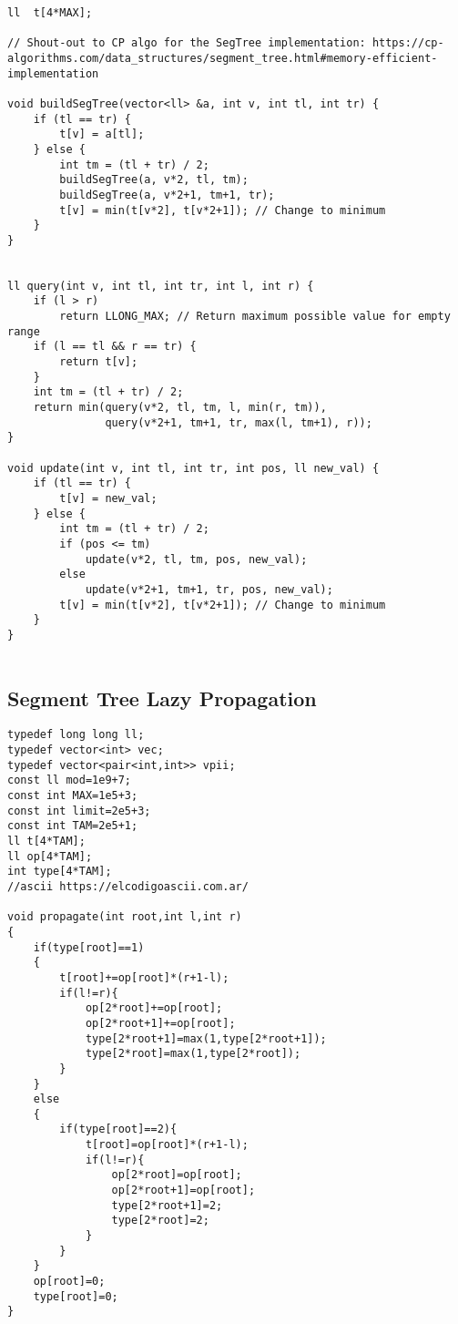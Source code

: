 \documentclass[10pt]{article}
\begin{document}
\begin{multicols*}{2}
\begin{lstlisting}[style=compactcpp]
ll  t[4*MAX];
 
// Shout-out to CP algo for the SegTree implementation: https://cp-algorithms.com/data_structures/segment_tree.html#memory-efficient-implementation
 
void buildSegTree(vector<ll> &a, int v, int tl, int tr) {
    if (tl == tr) {
        t[v] = a[tl];
    } else {
        int tm = (tl + tr) / 2;
        buildSegTree(a, v*2, tl, tm);
        buildSegTree(a, v*2+1, tm+1, tr);
        t[v] = min(t[v*2], t[v*2+1]); // Change to minimum
    }
}
 
 
ll query(int v, int tl, int tr, int l, int r) {
    if (l > r) 
        return LLONG_MAX; // Return maximum possible value for empty range
    if (l == tl && r == tr) {
        return t[v];
    }
    int tm = (tl + tr) / 2;
    return min(query(v*2, tl, tm, l, min(r, tm)),
               query(v*2+1, tm+1, tr, max(l, tm+1), r));
}
 
void update(int v, int tl, int tr, int pos, ll new_val) {
    if (tl == tr) {
        t[v] = new_val;
    } else {
        int tm = (tl + tr) / 2;
        if (pos <= tm)
            update(v*2, tl, tm, pos, new_val);
        else
            update(v*2+1, tm+1, tr, pos, new_val);
        t[v] = min(t[v*2], t[v*2+1]); // Change to minimum
    }
}
 
\end{lstlisting}

\subsection{Segment Tree Lazy Propagation}

\begin{lstlisting}[style=compactcpp]
typedef long long ll;
typedef vector<int> vec;
typedef vector<pair<int,int>> vpii;
const ll mod=1e9+7;
const int MAX=1e5+3;
const int limit=2e5+3;
const int TAM=2e5+1;
ll t[4*TAM];
ll op[4*TAM];
int type[4*TAM];
//ascii https://elcodigoascii.com.ar/

void propagate(int root,int l,int r)
{
    if(type[root]==1)
    {
        t[root]+=op[root]*(r+1-l);
        if(l!=r){
            op[2*root]+=op[root];
            op[2*root+1]+=op[root];
            type[2*root+1]=max(1,type[2*root+1]);
            type[2*root]=max(1,type[2*root]);
        }
    }
    else
    {
        if(type[root]==2){
            t[root]=op[root]*(r+1-l);
            if(l!=r){
                op[2*root]=op[root];
                op[2*root+1]=op[root];
                type[2*root+1]=2;
                type[2*root]=2;
            }
        }
    }
    op[root]=0;
    type[root]=0;
}


\end{lstlisting}
\end{multicols*}
\end{document}
